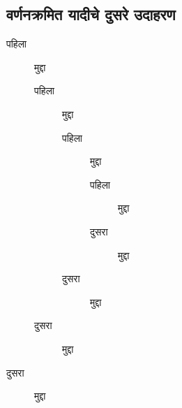\subsection*{वर्णनक्रमित यादीचे दुसरे उदाहरण}
\begin{description}
\item[पहिला] मुद्दा
\begin{description}
\item[पहिला] मुद्दा
\begin{description}
\item[पहिला] मुद्दा
\begin{description}
\item[पहिला] मुद्दा
\item[दुसरा] मुद्दा
\end{description}
\item[दुसरा] मुद्दा
\end{description}
\item[दुसरा] मुद्दा
\end{description}
\item[दुसरा] मुद्दा
\end{description}
